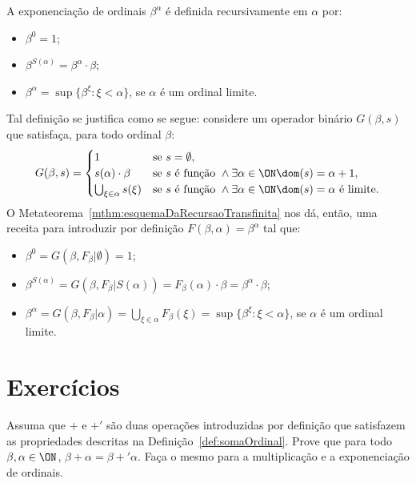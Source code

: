 \begin{definition}\label{def:exponenciacaoOrdinal}
    A exponenciação de ordinais $\beta^\alpha$ é definida recursivamente em $\alpha$ por:
    \begin{itemize}
        \item $\beta^0=1$;
        \item $\beta^{S(\alpha)}=\beta^\alpha\cdot \beta$;
        \item $\beta^\alpha=\sup\{\beta^\xi : \xi <\alpha\}$, se $\alpha$ é um ordinal limite.
    \end{itemize}

    Tal definição se justifica como se segue:
    considere um operador binário $G(\beta, s)$ que satisfaça, para todo ordinal $\beta$:
    \[
        G(\beta, s)=
        \begin{cases}
            1 & \text{se } s=\emptyset,\\
            s(\alpha)\cdot \beta & \text{se } s\text{ é função } \land  \exists \alpha \in \ON \dom(s)=\alpha+1,\\
            \bigcup_{\xi \in \alpha} s(\xi) & \text{se } s\text{ é função } \land \exists \alpha \in \ON \dom(s)=\alpha \text{ é limite}.
            \end{cases}
        \]
    O Metateorema~\ref{mthm:esquemaDaRecursaoTransfinita} nos dá, então, uma receita para introduzir por definição $F(\beta, \alpha)=\beta^\alpha$ tal que:
    \begin{itemize}
        \item $\beta^0=G(\beta, F_\beta|\emptyset)=1$;
        \item $\beta^{S(\alpha)}=G(\beta, F_\beta|S(\alpha))=F_\beta(\alpha)\cdot \beta=\beta^\alpha\cdot \beta$;
        \item $\beta^\alpha=G(\beta, F_\beta|\alpha)=\bigcup_{\xi \in \alpha} F_\beta(\xi)=\sup\{\beta^\xi : \xi <\alpha\}$, se $\alpha$ é um ordinal limite.
    \end{itemize}
\end{definition}

\section*{Exercícios}
\begin{exercise}
    Assuma que $+$ e $+'$ são duas operações introduzidas por definição que satisfazem as propriedades descritas na Definição~\ref{def:somaOrdinal}.
    Prove que para todo $\beta, \alpha \in \ON$, $\beta+\alpha=\beta+' \alpha$.
    Faça o mesmo para a multiplicação e a exponenciação de ordinais.
\end{exercise}

